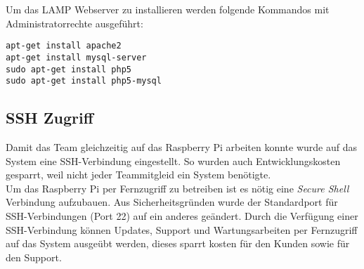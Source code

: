 Um das LAMP Webserver zu installieren werden folgende Kommandos mit Administratorrechte ausgeführt:\\
\begin{lstlisting}
apt-get install apache2
apt-get install mysql-server
sudo apt-get install php5
sudo apt-get install php5-mysql
\end{lstlisting}

\subsection{SSH Zugriff}
Damit das Team gleichzeitig auf das Raspberry Pi arbeiten konnte wurde auf das System eine SSH-Verbindung eingestellt. So wurden auch Entwicklungskosten gesparrt, weil nicht jeder Teammitgleid ein System benötigte.\\
Um das Raspberry Pi per Fernzugriff zu betreiben ist es nötig eine \textit{Secure Shell} Verbindung aufzubauen. Aus Sicherheitsgründen wurde der Standardport für SSH-Verbindungen (Port 22) auf ein anderes geändert. Durch die Verfügung einer SSH-Verbindung können Updates, Support und Wartungsarbeiten per Fernzugriff auf das System ausgeübt werden, dieses sparrt kosten für den Kunden sowie für den Support.


